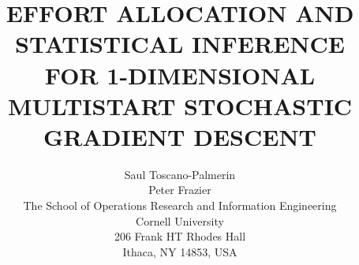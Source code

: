\documentclass{wscpaperproc}
\theoremstyle{wsc}
\begin{document}
%
%

\title{EFFORT ALLOCATION AND STATISTICAL INFERENCE\\ FOR 1-DIMENSIONAL MULTISTART STOCHASTIC GRADIENT DESCENT}


\author{
Saul Toscano-Palmerin \\
Peter Frazier \\[12pt]
The School of Operations Research and Information Engineering\\
Cornell University \\
206 Frank HT Rhodes Hall \\
Ithaca, NY 14853, USA
}




\maketitle
\end{document}
